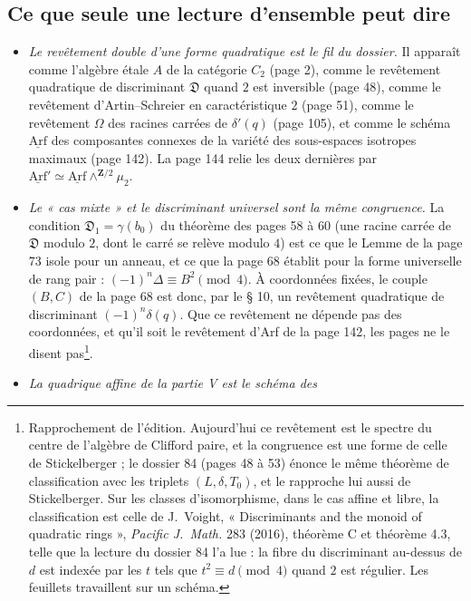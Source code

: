 \documentclass[11pt,a4paper]{article}
\begin{document}
\subsection*{Ce que seule une lecture d'ensemble peut dire}

\begin{itemize}
  \item \emph{Le revêtement double d'une forme quadratique est le fil du
    dossier.} Il apparaît comme l'algèbre étale $A$ de la catégorie $C_2$
    (page 2), comme le revêtement quadratique de discriminant $\mathfrak{D}$
    quand $2$ est inversible (page 48), comme le revêtement d'Artin--Schreier
    en caractéristique $2$ (page 51), comme le revêtement $\Omega$ des racines
    carrées de $\delta'(q)$ (page 105), et comme le schéma $\underline{\mathrm{Arf}}$ des
    composantes connexes de la variété des sous-espaces isotropes maximaux
    (page 142). La page 144 relie les deux dernières par
    $\underline{\mathrm{Arf}}' \simeq \underline{\mathrm{Arf}} \wedge^{\mathbf{Z}/2} \mu_2$.
  \item \emph{Le « cas mixte » et le discriminant universel sont la même
    congruence.} La condition $\mathfrak{D}_1 = \gamma(b_0)$ du théorème des
    pages 58 à 60 (une racine carrée de $\mathfrak{D}$ modulo $2$, dont le carré
    se relève modulo $4$) est ce que le Lemme de la page 73 isole pour un
    anneau, et ce que la page 68 établit pour la forme universelle de rang pair
    : $(-1)^n \Delta \equiv B^2 \pmod 4$. À coordonnées fixées, le couple
    $(B, C)$ de la page 68 est donc, par le § 10, un revêtement quadratique de
    discriminant $(-1)^n \delta(q)$. Que ce revêtement ne dépende pas des
    coordonnées, et qu'il soit le revêtement d'Arf de la page 142, les pages
    ne le disent pas\footnote{Rapprochement de l'édition. Aujourd'hui ce
    revêtement est le spectre du centre de l'algèbre de Clifford paire, et la
    congruence est une forme de celle de Stickelberger ; le dossier 84 (pages
    48 à 53) énonce le même théorème de classification avec les triplets
    $(L, \delta, T_0)$, et le rapproche lui aussi de Stickelberger. Sur les
classes d'isomorphisme, dans le cas affine et libre, la classification est
celle de J.~Voight, « Discriminants and the monoid of quadratic rings »,
\emph{Pacific J.\ Math.} 283 (2016), théorème C et théorème 4.3, telle que la
lecture du dossier 84 l'a lue : la fibre du discriminant au-dessus de $d$ est
indexée par les $t$ tels que $t^2 \equiv d \pmod 4$ quand $2$ est
régulier. Les feuillets travaillent sur un schéma.}.
  \item \emph{La quadrique affine de la partie V est le schéma des
}
\end{itemize}
\end{document}
